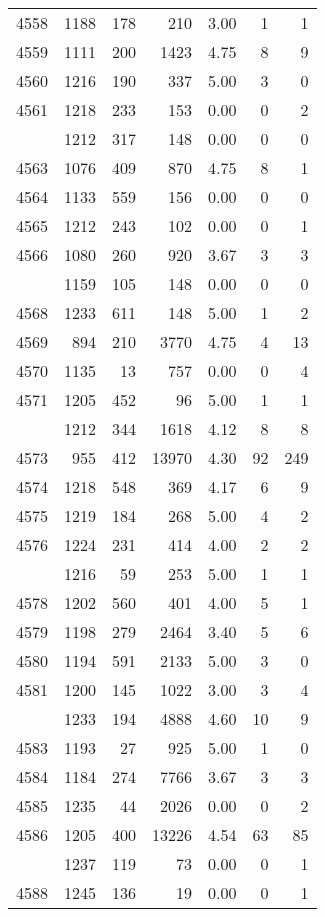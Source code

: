 \documentclass[
]{article}
\begin{document}
\begin{table}
\begin{tabular}[t]{lrrrrrr}
4558 & 1188 & 178 & 210 & 3.00 & 1 & 1\\
4559 & 1111 & 200 & 1423 & 4.75 & 8 & 9\\
4560 & 1216 & 190 & 337 & 5.00 & 3 & 0\\
4561 & 1218 & 233 & 153 & 0.00 & 0 & 2\\
\addlinespace
4562 & 1212 & 317 & 148 & 0.00 & 0 & 0\\
4563 & 1076 & 409 & 870 & 4.75 & 8 & 1\\
4564 & 1133 & 559 & 156 & 0.00 & 0 & 0\\
4565 & 1212 & 243 & 102 & 0.00 & 0 & 1\\
4566 & 1080 & 260 & 920 & 3.67 & 3 & 3\\
\addlinespace
4567 & 1159 & 105 & 148 & 0.00 & 0 & 0\\
4568 & 1233 & 611 & 148 & 5.00 & 1 & 2\\
4569 & 894 & 210 & 3770 & 4.75 & 4 & 13\\
4570 & 1135 & 13 & 757 & 0.00 & 0 & 4\\
4571 & 1205 & 452 & 96 & 5.00 & 1 & 1\\
\addlinespace
4572 & 1212 & 344 & 1618 & 4.12 & 8 & 8\\
4573 & 955 & 412 & 13970 & 4.30 & 92 & 249\\
4574 & 1218 & 548 & 369 & 4.17 & 6 & 9\\
4575 & 1219 & 184 & 268 & 5.00 & 4 & 2\\
4576 & 1224 & 231 & 414 & 4.00 & 2 & 2\\
\addlinespace
4577 & 1216 & 59 & 253 & 5.00 & 1 & 1\\
4578 & 1202 & 560 & 401 & 4.00 & 5 & 1\\
4579 & 1198 & 279 & 2464 & 3.40 & 5 & 6\\
4580 & 1194 & 591 & 2133 & 5.00 & 3 & 0\\
4581 & 1200 & 145 & 1022 & 3.00 & 3 & 4\\
\addlinespace
4582 & 1233 & 194 & 4888 & 4.60 & 10 & 9\\
4583 & 1193 & 27 & 925 & 5.00 & 1 & 0\\
4584 & 1184 & 274 & 7766 & 3.67 & 3 & 3\\
4585 & 1235 & 44 & 2026 & 0.00 & 0 & 2\\
4586 & 1205 & 400 & 13226 & 4.54 & 63 & 85\\
\addlinespace
4587 & 1237 & 119 & 73 & 0.00 & 0 & 1\\
4588 & 1245 & 136 & 19 & 0.00 & 0 & 1\\

\end{tabular}
\end{table}
\end{document}
